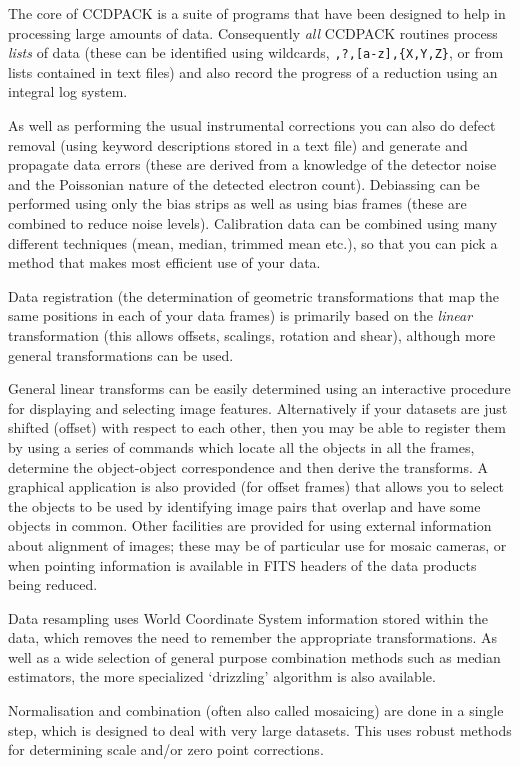 \documentclass[twoside,11pt]{article}
\newcommand{\latexhtml}[2]{#1}
\renewcommand{\_}{\texttt{\symbol{95}}}
\newcommand{\ttsize}{\latexhtml{\small}{}}
\newcommand{\text}[1]{{\ttsize \tt #1}}
\begin{document}
The core of CCDPACK is a suite of programs that have been designed to
help in processing large amounts of data.  Consequently {\em all\/}
CCDPACK routines process {\em lists\/} of data (these can be identified
using wildcards, \text{*,?,[a-z],\{X,Y,Z\}}, or from lists contained in
text files) and also record the progress of a reduction using an
integral log system.

As well as performing the usual instrumental corrections you can
also do defect removal (using keyword descriptions stored in a text file)
and generate and propagate data errors (these are derived from a knowledge
of the detector noise and the Poissonian nature of the detected
electron count).
Debiassing can be performed using only the bias strips as well as
using bias frames (these are combined to reduce noise levels).
Calibration data can be combined using many different techniques
(mean, median, trimmed mean etc.), so that you can pick a method that
makes most efficient use of your data.

Data registration (the determination of geometric transformations that
map the same positions in each of your data frames) is primarily based
on the {\em linear} transformation (this allows offsets, scalings,
rotation and shear), although more general transformations can be
used.

General linear transforms can be easily determined using an
interactive procedure for displaying and selecting image features.
Alternatively if your datasets are just shifted (offset) with respect
to each other, then you may be able to register them by using a series
of commands which locate all the objects in all the frames,
determine the object-object correspondence and then derive the
transforms.
A graphical application is also provided (for offset frames) that allows
you to select the objects to be used by identifying image pairs that
overlap and have some objects in common.
Other facilities are provided for using external information about
alignment of images; these may be of particular use for mosaic
cameras, or when pointing information is available in FITS headers
of the data products being reduced.

Data resampling uses World Coordinate System information stored 
within the data, which removes the need to remember the
appropriate transformations. 
As well as a wide selection of general purpose combination methods 
such as median estimators, the more specialized `drizzling' 
algorithm is also available.

Normalisation and combination (often also called mosaicing) 
are done in a single step, which is
designed to deal with very large datasets.
This uses robust methods for determining scale and/or zero point
corrections.
\end{document}
